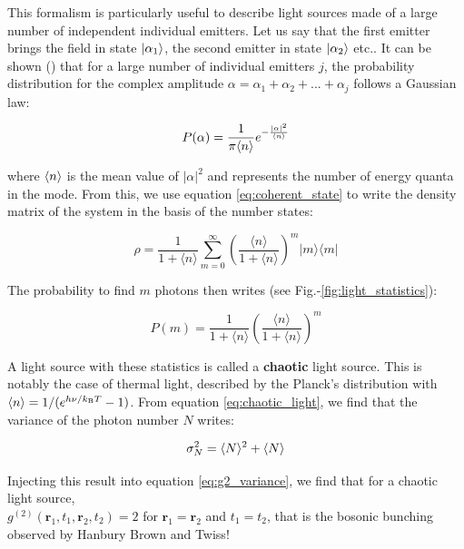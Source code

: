 This formalism is particularly useful to describe light sources made of a large number of independent individual emitters. Let us say that the first emitter brings the field in state $\ket{\alpha_1}$, the second emitter in state $\ket{\alpha_2}$ etc.. It can be shown (\cite{glauber1963coherent}) that for a large number of individual emitters $j$, the probability distribution for the complex amplitude $\alpha=\alpha_1 + \alpha_2 + ... + \alpha_j$ follows a Gaussian law:

\begin{equation}
    P(\alpha)= \frac{1}{\pi \langle n\rangle} e^{-\frac{|\alpha|^2}{\langle n\rangle}}
    \label{eq:p_alpha}
\end{equation}

\noindent where $\langle n\rangle$ is the mean value of $|\alpha|^2$ and represents the number of energy quanta in the mode. From this, we use equation \ref{eq:coherent_state} to write the density matrix of the system in the basis of the number states:

\begin{equation}
    \hat{\rho}=\frac{1}{1+\langle n\rangle} \sum_{m=0}^{\infty}\left(\frac{\langle n\rangle}{1+\langle n\rangle}\right)^{m}|m\rangle\langle m|
    \label{eq:rho_chaotic}
\end{equation}

\noindent The probability to find $m$ photons then writes (see Fig.-\ref{fig:light_statistics}):

\begin{equation}
    P(m)=\frac{1}{1+\langle n\rangle}\left(\frac{\langle n\rangle}{1+\langle n\rangle}\right)^{m}
    \label{eq:chaotic_light}
\end{equation}


\noindent A light source with these statistics is called a \textbf{chaotic} light source. This is notably the case of thermal light, described by the Planck's distribution with $\langle n\rangle=1/(e^{h\nu/k_{\mathrm{B}} T}-1)$. From equation \ref{eq:chaotic_light}, we find that the variance of the photon number $N$ writes:

\begin{equation}
    \sigma_N^2=\langle N\rangle^2+\langle N\rangle
\end{equation}

\noindent Injecting this result into equation \ref{eq:g2_variance}, we find that for a chaotic light source, \\ $g^{(2)}\left(\bm{r}_{1}, t_{1}, \bm{r}_{2}, t_{2}\right)=2$ for $\bm{r}_{1}=\bm{r}_{2}$ and $t_1=t_2$, that is the bosonic bunching observed by Hanbury Brown and Twiss!



